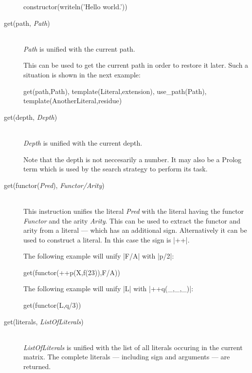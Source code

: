 \begin{description}
    \begin{BoxedSample}
      constructor(writeln('Hello world.'))%
    \end{BoxedSample}


  \item [get(path, {\em Path})]\ 
    \\
    {\em Path}\/ is unified with the current path.

    This can be used to get the current path in order to restore it
    later. Such a situation is shown in the next example:

    \begin{BoxedSample}
      get(path,Path),
      template(Literal,extension),
      use\_path(Path),
      template(AnotherLiteral,residue)%
    \end{BoxedSample}
 

  \item [get(depth, {\em Depth})]\ 
    \\
    {\em Depth}\/ is unified with the current depth.

    Note that the depth is not neccesarily a number. It may also be a Prolog
    term which is used by the search strategy to perform its task.

  \item [get(functor({\em Pred}), {\em Functor/Arity})]%
    \ 
    \\
    This instruction unifies the literal {\em Pred}\/ with the literal
    having the functor {\em Functor}\/ and the arity {\em Arity}. This can be
    used to extract the functor and arity from a literal --- which has an
    additional sign. Alternatively it can be used to construct a literal. In
    this case the sign is |++|.

    The following example will unify |F/A| with |p/2|:
    \begin{BoxedSample}
      get(functor(++p(X,f(23)),F/A))%
    \end{BoxedSample}

    The following example will unify |L| with |++q(_,_,_)|:
    \begin{BoxedSample}
      get(functor(L,q/3))%
    \end{BoxedSample}

  \item [get(literals, {\em ListOfLiterals})]\ 
    \\
    {\em ListOfLiterals}\/ is unified with the list of all literals occuring
    in the current matrix. The complete literals --- including sign and
    arguments --- are returned.



\end{description}
